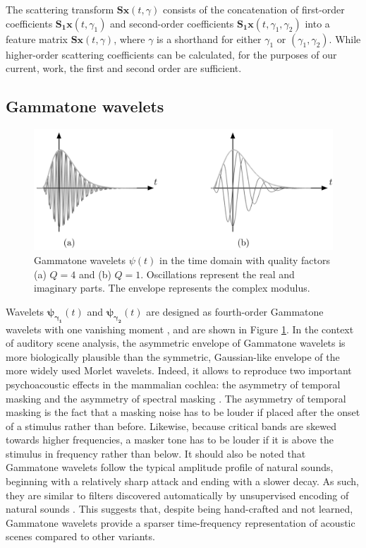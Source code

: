 \documentclass[journal]{IEEEtran}
\begin{document}
The scattering transform $\mathbf{S}\boldsymbol{x}(t,\gamma)$ consists of the concatenation of first-order coefficients $\mathbf{S_1}\boldsymbol{x}(t,\gamma_1)$ and second-order coefficients $\mathbf{S_1}\boldsymbol{x}(t,\gamma_1,\gamma_2)$ into a feature matrix $\mathbf{S}\boldsymbol{x}(t,\gamma)$, where $\gamma$ is a shorthand for either $\gamma_1$ or $(\gamma_1,\gamma_2)$. While higher-order scattering coefficients can be calculated, for the purposes of our current, work, the first and second order are sufficient.

\subsection{Gammatone wavelets}
\begin{figure}
\begin{center}
\includegraphics[width=\columnwidth]{bw/gammatones}
\caption{
\label{fig:gammatones}
Gammatone wavelets $\psi(t)$ in the time domain with quality factors (a) $Q = 4$ and (b) $Q = 1$. 
Oscillations represent the real and imaginary parts. The envelope represents the complex modulus.}
\end{center}
\end{figure}
Wavelets
$\boldsymbol{\psi_{\gamma_1}}(t)$ and $\boldsymbol{\psi_{\gamma_2}}(t)$ are designed as fourth-order Gammatone
wavelets with one vanishing moment \cite{Venkitaraman2014}, and are shown in Figure \ref{fig:gammatones}.
In the context of auditory scene analysis, the asymmetric envelope of Gammatone wavelets is more biologically plausible than the symmetric, Gaussian-like envelope of the more widely used Morlet wavelets.
Indeed, it allows to reproduce two important psychoacoustic effects in the mammalian cochlea: the asymmetry of temporal masking and the asymmetry of spectral masking  \cite{Fastl2007}.
The asymmetry of temporal masking is the fact that a masking noise has to be louder if placed after the onset of a stimulus rather than before.
Likewise, because critical bands are skewed towards higher frequencies, a masker tone has to be louder if it is above the stimulus in frequency rather than below.
It should also be noted that Gammatone wavelets follow the typical amplitude profile of natural sounds, beginning with a relatively sharp attack and ending with a slower decay.
As such, they are similar to filters discovered automatically by unsupervised encoding of natural sounds \cite{Smith2006}.
This suggests that, despite being hand-crafted and not learned, Gammatone wavelets provide a sparser time-frequency representation of acoustic scenes compared to other variants.
\end{document}
